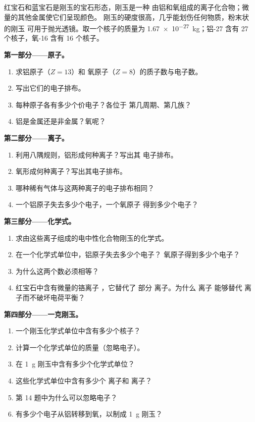 \begin{problem}
\label{pb:g10:electron-shells:1}
红宝石和蓝宝石是刚玉的宝石形态，刚玉是一种
由铝和氧组成的离子化合物；微量的其他金属使它们呈现颜色。
刚玉的硬度很高，几乎能划伤任何物质，粉末状的刚玉
可用于抛光透镜。取一个核子的质量为
\qty{1.67e-27}{kg}；铝-27 含有 27 个核子，氧-16 含有 16 个核子。

\medskip
\noindent\textbf{第一部分——原子。}
\begin{enumerate}
  \item 求铝原子（$Z = 13$）和
        氧原子（$Z = 8$）的质子数与电子数。
  \item 写出它们的电子排布。
  \item 每种原子各有多少个价电子？各位于
        第几周期、第几族？
  \item 铝是金属还是非金属？氧呢？
\end{enumerate}

\medskip
\noindent\textbf{第二部分——离子。}
\begin{enumerate}[resume]
  \item 利用八隅规则，铝形成何种离子？写出其
        电子排布。
  \item 氧形成何种离子？写出其电子排布。
  \item 哪种稀有气体与这两种离子的电子排布相同？
  \item 一个铝原子失去多少个电子，一个氧原子
        得到多少个电子？
\end{enumerate}

\medskip
\noindent\textbf{第三部分——化学式。}
\begin{enumerate}[resume]
  \item 求由这些离子组成的电中性化合物刚玉的化学式。
  \item 在一个化学式单位中，铝原子失去多少个电子？
        氧原子得到多少个电子？
  \item 为什么这两个数必须相等？
  \item 红宝石中含有微量的铬离子 ，它替代了
        部分  离子。为什么  离子
        能够替代  离子而不破坏电荷平衡？
\end{enumerate}

\medskip
\noindent\textbf{第四部分——一克刚玉。}
\begin{enumerate}[resume]
  \item 一个刚玉化学式单位中含有多少个核子？
  \item 计算一个化学式单位的质量（忽略电子）。
  \item 在 \qty{1}{g} 刚玉中含有多少个化学式单位？
  \item 这些化学式单位中含有多少个  离子和  离子？
  \item 第 14 题中为什么可以忽略电子？
  \item 有多少个电子从铝转移到氧，以制成
        \qty{1}{g} 刚玉？
\end{enumerate}
\end{problem}
